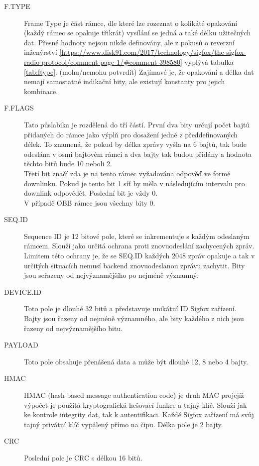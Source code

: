\documentclass{ctuthesis}
\begin{document}
\begin{description}
\item[F.TYPE]
Frame Type je část rámce, dle které lze rozeznat o kolikáté opakování (každý rámec se opakuje třikrát) vysílání se jedná a také délku užitečných dat. Přesné hodnoty nejsou nikde definovány, ale z pokusů o reverzní inženýrství \ref{https://www.disk91.com/2017/technology/sigfox/the-sigfox-radio-protocol/comment-page-1/#comment-398580} vyplývá tabulka \ref{tab:ftype}. (mohu/nemohu potvrdit) Zajímavé je, že opakování a délka dat nemají samostatné indikační bity, ale existují konstanty pro jejich kombinace.
\item[F.FLAGS]
Tato půslabika je rozdělená do tří částí. První dva bity určují počet bajtů přidaných do rámce jako výplň pro dosažení jedné z předdefinovaných délek. To znamená, že pokud by délka zprávy vyšla na 6 bajtů, tak bude odeslána v osmi bajtovém rámci a dva bajty tak budou přidány a hodnota těchto bitů bude 10 neboli 2.\\
Třetí bit značí zda je na tento rámec vyžadována odpověď ve formě downlinku. Pokud je tento bit 1 síť by měla v následujícím intervalu pro downlink odpovědět. Poslední bit je vždy 0.\\
V případě OBB rámce jsou všechny bity 0.
\item[SEQ.ID]
Sequence ID je 12 bitové pole, které se inkrementuje s každým odeslaným rámcem. Slouží jako určitá ochrana proti znovuodeslání zachycených zpráv. Limitem této ochrany je, že se SEQ.ID každých 2048 zpráv opakuje a tak v určitých situacích nemusí backend znovuodeslanou zprávu zachytit. Bity jsou seřazeny od nejvýznamějšího po nejméně významný.
\item[DEVICE.ID]
Toto pole je dlouhé 32 bitů a představuje unikátní ID Sigfox zařízení. Bajty jsou řazeny od nejméně významného, ale bity každého z nich jsou řazeny od nejvýznamějšího bitu.
\item[PAYLOAD]
Toto pole obsahuje přenášená data a může být dlouhé 12, 8 nebo 4 bajty.
\item[HMAC]
HMAC (hash-based message authentication code) je druh MAC projejíž výpočet je použitá kryptografická hešovací funkce a tajný klíč. Slouží jak ke kontrole integrity dat, tak k autentifikaci. Každé Sigfox zařízení má svůj tajný privátní klíč vypálený přímo na čipu. Délka pole je 2 bajty.
\item[CRC]
Poslední pole je CRC s délkou 16 bitů.
\end{description}
\end{document}

